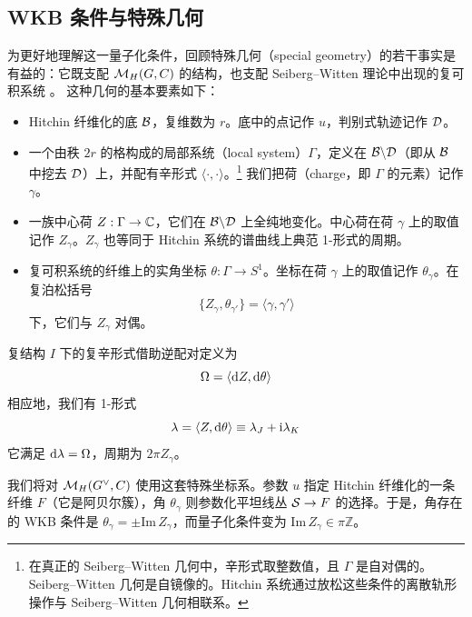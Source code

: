 \subsection{WKB 条件与特殊几何}
为更好地理解这一量子化条件，回顾特殊几何（special geometry）的若干事实是有益的：它既支配 $\M_H(G,C)$ 的结构，也支配 Seiberg–Witten 理论中出现的复可积系统 \cite{Seiberg:1994rs,GKMMM,DoW,Freed:1997dp, Gaiotto:2008cd}。
这种几何的基本要素如下：
\begin{itemize}
\item Hitchin 纤维化的底 ${\cB}$，复维数为 $r$。底中的点记作 $u$，判别式轨迹记作 ${\cal D}$。
\item 一个由秩 $2r$ 的格构成的局部系统（local system）$\Gamma$，定义在 ${\cal B}\backslash {\cal D}$（即从 $\cal B$ 中挖去 $\cal D$）上，并配有辛形式 $\langle\cdot,\cdot \rangle$。\footnote{在真正的 Seiberg–Witten 几何中，辛形式取整数值，且 $\Gamma$ 是自对偶的。Seiberg–Witten 几何是自镜像的。Hitchin 系统通过放松这些条件的离散轨形操作与 Seiberg–Witten 几何相联系。} 我们把荷（charge，即 $\Gamma$ 的元素）记作 $\gamma$。
\item 一族中心荷 $Z: \Gamma \to \C$，它们在 ${\cal B}\backslash{\cal D}$ 上全纯地变化。中心荷在荷 $\gamma$ 上的取值记作 $Z_\gamma$。$Z_\gamma$ 也等同于 Hitchin 系统的谱曲线上典范 1-形式的周期。
\item 复可积系统的纤维上的实角坐标 $\theta: \Gamma \to S^1$。坐标在荷 $\gamma$ 上的取值记作 $\theta_\gamma$。在复泊松括号
\begin{equation}
\{Z_\gamma, \theta_{\gamma'} \} = \langle \gamma, \gamma' \rangle
\end{equation}
下，它们与 $Z_\gamma$ 对偶。
\end{itemize}

复结构 $I$ 下的复辛形式借助逆配对定义为
\begin{equation}
\Omega = \langle \d Z, \d\theta \rangle
\end{equation}
相应地，我们有 1-形式
\begin{equation}
\lambda  = \langle Z, \d\theta \rangle\equiv \lambda_J + \i \lambda_K
\end{equation}
它满足 $\d\lambda=\Omega$，周期为 $2 \pi Z_\gamma$。

我们将对 $\M_H(G^\vee,C)$ 使用这套特殊坐标系。参数 $u$ 指定 Hitchin 纤维化的一条纤维 $F$（它是阿贝尔簇），角 $\theta_\gamma$ 则参数化平坦线丛 $\S\to F$ 的选择。于是，角存在的 WKB 条件是 $\theta_\gamma = \pm \mathrm{Im}\,Z_\gamma$，而量子化条件变为 $\mathrm{Im}\, Z_\gamma \in \pi \mathbb{Z}$。

